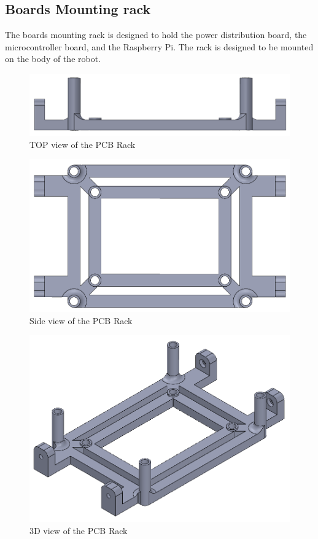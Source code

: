 \newpage
\subsection{Boards Mounting rack}
The boards mounting rack is designed to hold the power distribution board, the microcontroller board, and the Raspberry Pi.
The rack is designed to be mounted on the body of the robot.
\begin{figure}[h]
	\centering
	\includegraphics[width=.5\linewidth]{PCB_Rack_1}
	\caption[Side view of the PCB Rack]{TOP view of the PCB Rack}
	\label{fig:pcbrack1}
\end{figure}
\begin{figure}[h]
	\centering
	\includegraphics[width=.5\linewidth]{PCB_Rack_2}
	\caption[Top view of the PCB Rack]{Side view of the PCB Rack}
	\label{fig:pcbrack2}
\end{figure}
\begin{figure}[h]
	\centering
	\includegraphics[width=.5\linewidth]{PCB_Rack_3}
	\caption[3D view of the PCB Rack]{3D view of the PCB Rack}
	\label{fig:pcbrack3}
\end{figure}
\newpage
